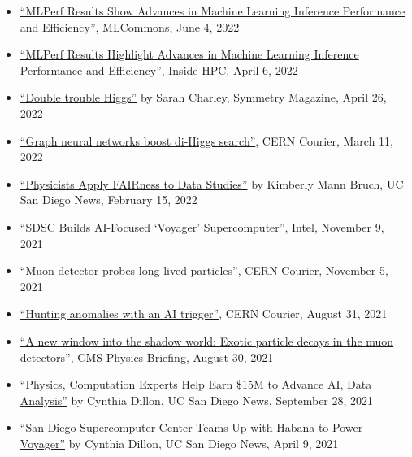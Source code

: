 \documentclass[11pt]{res}
\begin{document}
\begin{resume}
\begin{itemize}
    \item \href{https://mlcommons.org/en/news/mlperf-inference-1q2022/}{``MLPerf Results Show Advances in Machine Learning Inference Performance and Efficiency''}, MLCommons, June 4, 2022
    \item \href{https://insidehpc.com/2022/04/mlperf-results-highlight-advances-in-machine-learning-inference-performance-and-efficiency/}{``MLPerf Results Highlight Advances in Machine Learning Inference Performance and Efficiency''}, Inside HPC, April 6, 2022
    \item \href{https://www.symmetrymagazine.org/article/double-trouble-higgs}{``Double trouble Higgs''} by Sarah Charley, Symmetry Magazine, April 26, 2022
    \item \href{https://cerncourier.com/a/graph-neural-networks-boost-di-higgs-search/}{``Graph neural networks boost di-Higgs search''}, CERN Courier, March 11, 2022
    \item \href{https://ucsdnews.ucsd.edu/pressrelease/physicists-apply-fairness-to-data-studies}{``Physicists Apply FAIRness to Data Studies''} by Kimberly Mann Bruch, UC San Diego News, February 15, 2022
    \item \href{https://www.intel.com/content/www/us/en/customer-spotlight/stories/san-diego-supercomputer-customer-story.html}{``SDSC Builds AI-Focused `Voyager' Supercomputer''}, Intel, November 9, 2021
    \item \href{https://cerncourier.com/a/muon-detector-probes-long-lived-particles/}{``Muon detector probes long-lived particles''}, CERN Courier, November 5, 2021
    \item \href{https://cerncourier.com/a/hunting-anomalies-with-an-ai-trigger/}{``Hunting anomalies with an AI trigger''}, CERN Courier, August 31, 2021
    \item \href{https://cms.cern/news/new-window-shadow-world-exotic-particle-decays-muon-detectors}{``A new window into the shadow world: Exotic particle decays in the muon detectors''}, CMS Physics Briefing, August 30, 2021
    \item \href{https://ucsdnews.ucsd.edu/pressrelease/physics-computation-experts-help-earn-15m-to-advance-ai-data-analysis}{``Physics, Computation Experts Help Earn \$15M to Advance AI, Data Analysis''} by Cynthia Dillon, UC San Diego News, September 28, 2021
    \item \href{https://ucsdnews.ucsd.edu/pressrelease/san-diego-supercomputer-center-teams-up-with-habana-to-power-voyager}{``San Diego Supercomputer Center Teams Up with Habana to Power Voyager''} by Cynthia Dillon, UC San Diego News, April 9, 2021

\end{itemize}
\end{resume}
\end{document}
